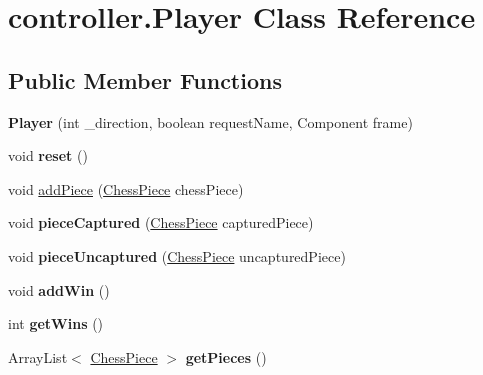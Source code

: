 \hypertarget{classcontroller_1_1_player}{\section{controller.\-Player Class Reference}
\label{classcontroller_1_1_player}
}
\subsection*{Public Member Functions}
\begin{DoxyCompactItemize}
\item 
\hypertarget{classcontroller_1_1_player_ad6355127f04cc3c7f5462fbe70d0f68b}{{\bfseries Player} (int \-\_\-direction, boolean request\-Name, Component frame)}\label{classcontroller_1_1_player_ad6355127f04cc3c7f5462fbe70d0f68b}

\item 
\hypertarget{classcontroller_1_1_player_ab8a0a1a337ccc52adc53be49c76a88bd}{void {\bfseries reset} ()}\label{classcontroller_1_1_player_ab8a0a1a337ccc52adc53be49c76a88bd}

\item 
void \hyperlink{classcontroller_1_1_player_a518a70950cef524de42c88831baa6c22}{add\-Piece} (\hyperlink{classmodel_1_1_chess_piece}{Chess\-Piece} chess\-Piece)
\item 
\hypertarget{classcontroller_1_1_player_ad119fb7e415d69488a14ebacb27bcd3a}{void {\bfseries piece\-Captured} (\hyperlink{classmodel_1_1_chess_piece}{Chess\-Piece} captured\-Piece)}\label{classcontroller_1_1_player_ad119fb7e415d69488a14ebacb27bcd3a}

\item 
\hypertarget{classcontroller_1_1_player_a3b008486e58dc7deb8bebf8ab803fd99}{void {\bfseries piece\-Uncaptured} (\hyperlink{classmodel_1_1_chess_piece}{Chess\-Piece} uncaptured\-Piece)}\label{classcontroller_1_1_player_a3b008486e58dc7deb8bebf8ab803fd99}

\item 
\hypertarget{classcontroller_1_1_player_ad29800b034a59ef08b14b8ebe7f3f109}{void {\bfseries add\-Win} ()}\label{classcontroller_1_1_player_ad29800b034a59ef08b14b8ebe7f3f109}

\item 
\hypertarget{classcontroller_1_1_player_a7c8b12125102931c40862b340edd51a1}{int {\bfseries get\-Wins} ()}\label{classcontroller_1_1_player_a7c8b12125102931c40862b340edd51a1}

\item 
\hypertarget{classcontroller_1_1_player_a4d1bc127a3148d87b3119247c43ec97d}{Array\-List$<$ \hyperlink{classmodel_1_1_chess_piece}{Chess\-Piece} $>$ {\bfseries get\-Pieces} ()}\label{classcontroller_1_1_player_a4d1bc127a3148d87b3119247c43ec97d}


\end{DoxyCompactItemize}

